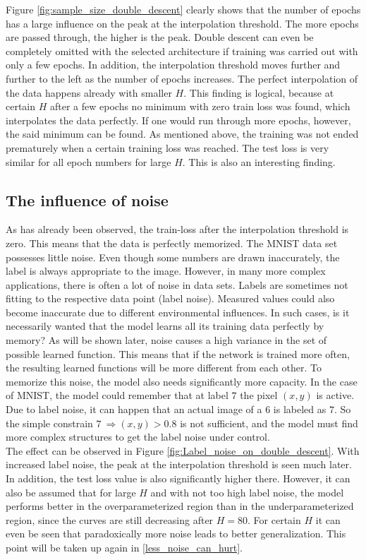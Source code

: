 Figure \ref{fig:sample_size_double_descent} clearly shows that the number of epochs has a large influence on the peak at the interpolation threshold. The more epochs are passed through, the higher is the peak. 
Double descent can even be completely omitted with the selected architecture if training was carried out with only a few epochs. In addition, the interpolation threshold moves further and further to the left as the number of epochs increases. The perfect interpolation of the data happens already with smaller $H$. This finding is logical, because at certain $H$ after a few epochs no minimum with zero train loss was found, which interpolates the data perfectly. If one would run through more epochs, however, the said minimum can be found.
As mentioned above, the training was not ended prematurely when a certain training loss was reached. The test loss is very similar for all epoch numbers for large $H$. This is also an interesting finding.




\subsection{The influence of noise}

As has already been observed, the train-loss after the interpolation threshold is zero. This means that the data is perfectly memorized. The MNIST data set possesses little noise. Even though some numbers are drawn inaccurately, the label is always appropriate to the image. However, in many more complex applications, there is often a lot of noise in data sets. Labels are sometimes not fitting to the respective data point (label noise). Measured values could also become inaccurate due to different environmental influences. In such cases, is it necessarily wanted that the model learns all its training data perfectly by memory? As will be shown later, noise causes a high variance in the set of possible learned function. This means that if the network is trained more often, the resulting learned functions will be more different from each other. To memorize this noise, the model also needs significantly more capacity. In the case of MNIST, the model could remember that at label $7$ the pixel $(x,y)$ is active. Due to label noise, it can happen that an actual image of a $6$ is labeled as $7$. So the simple constrain $7 \	\Longrightarrow (x,y) > 0.8$ is not sufficient, and the model must find more complex structures to get the label noise under control.\\
The effect can be observed in Figure \ref{fig:Label_noise_on_double_descent}. With increased label noise, the peak at the interpolation threshold is seen much later. In addition, the test loss value is also significantly higher there. However, it can also be assumed that for large $H$ and with not too high label noise, the model performs better in the overparameterized region than in the underparameterized region, since the curves are still decreasing after $H = 80$. For certain $H$ it can even be seen that paradoxically more noise leads to better generalization. This point will be taken up again in \ref{less_noise_can_hurt}. 


